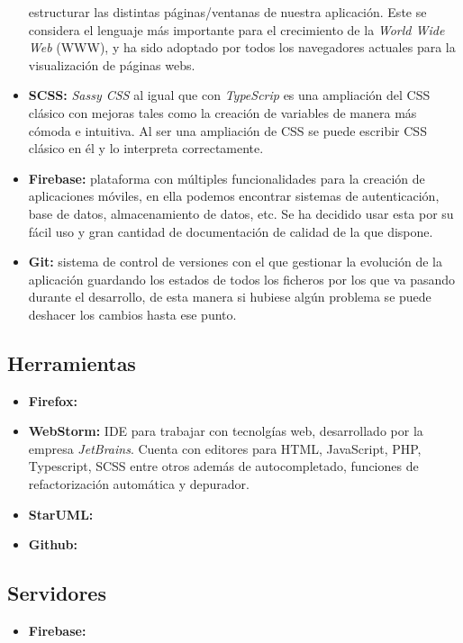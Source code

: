 \begin{itemize}
    estructurar las distintas páginas/ventanas de nuestra aplicación. Este se considera el lenguaje
    más importante para el crecimiento de la \textit{World Wide Web} (WWW), y ha sido adoptado por
    todos los navegadores actuales para la visualización de páginas webs.
    \item\textbf{SCSS:} \textit{Sassy CSS} al igual que con \textit{TypeScrip} es una ampliación del
    CSS clásico con mejoras tales como la creación de variables de manera más cómoda e intuitiva.
    Al ser una ampliación de CSS se puede escribir CSS clásico en él y lo interpreta correctamente.
    \item\textbf{Firebase:} plataforma con múltiples funcionalidades para la creación de aplicaciones
    móviles, en ella podemos encontrar sistemas de autenticación, base de datos, almacenamiento de
    datos, etc. Se ha decidido usar esta por su fácil uso y gran cantidad de documentación de calidad
    de la que dispone.
    \item\textbf{Git:} sistema de control de versiones con el que gestionar la evolución de la
    aplicación guardando los estados de todos los ficheros por los que va pasando durante el
    desarrollo, de esta manera si hubiese algún problema se puede deshacer los cambios hasta ese
    punto.
\end{itemize}

\subsection{Herramientas}
\begin{itemize}
    \item\textbf{Firefox:}
    \item\textbf{WebStorm:} IDE para trabajar con tecnolgías web, desarrollado por la empresa
    \textit{JetBrains}\cite{jetbrains}. Cuenta con editores para HTML, JavaScript, PHP,
    Typescript, SCSS entre otros además de autocompletado, funciones de refactorización
    automática y depurador.
    \item\textbf{StarUML:}
    \item\textbf{Github:}
\end{itemize}

\subsection{Servidores}
\begin{itemize}
    \item\textbf{Firebase:}
\end{itemize}
